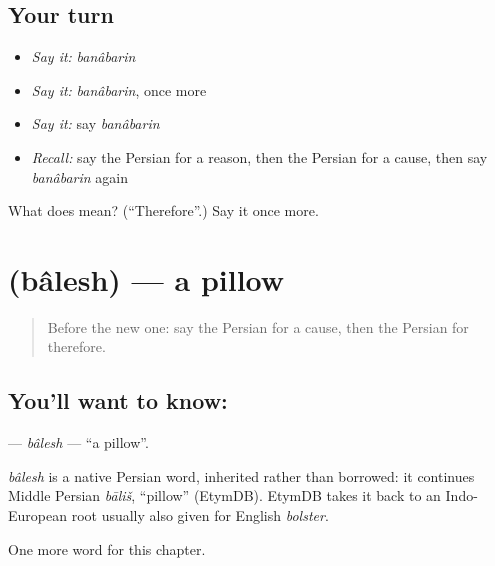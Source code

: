 \subsection*{Your turn}
\begin{itemize}
\raggedright
  \item \emph{Say it:} \emph{banâbarin}
  \item \emph{Say it:} \emph{banâbarin}, once more
  \item \emph{Say it:} say \emph{banâbarin}
  \item \emph{Recall:} say the Persian for a reason, then the Persian for a cause, then say \emph{banâbarin} again
\end{itemize}

\begin{tcolorbox}[breakable,colback=teal!4,colframe=teal!35!black,title={Before you move on}]
What does  mean? (\textquotedblleft{}Therefore\textquotedblright{}.) Say it once more.
\end{tcolorbox}
\section[\texorpdfstring{\fa{بالش} (bâlesh)}{بالش (bâlesh)}]{ (bâlesh) — a pillow}

\label{lesson:FA-C93-balesh}



\begin{quote}
Before the new one: say the Persian for a cause, then the Persian for therefore.
\end{quote}

\subsection*{You'll want to know: }
\textbf{} — \emph{bâlesh} — \textquotedblleft{}a pillow\textquotedblright{}.

\begin{cousinweb}
\emph{bâlesh} is a native Persian word, inherited rather than borrowed: it continues Middle Persian \emph{bāliš}, \textquotedblleft{}pillow\textquotedblright{} (EtymDB). EtymDB takes it back to an Indo-European root usually also given for English \emph{bolster}.
\end{cousinweb}

\begin{grammarlens}[title={What you've built}]
One more word for this chapter.
\end{grammarlens}

